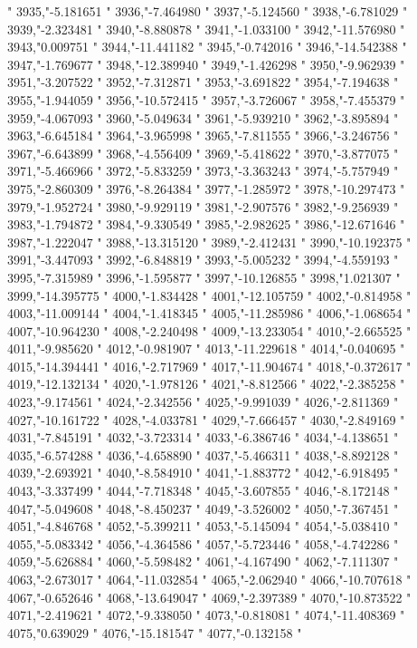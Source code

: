 "
3935,"-5.181651
"
3936,"-7.464980
"
3937,"-5.124560
"
3938,"-6.781029
"
3939,"-2.323481
"
3940,"-8.880878
"
3941,"-1.033100
"
3942,"-11.576980
"
3943,"0.009751
"
3944,"-11.441182
"
3945,"-0.742016
"
3946,"-14.542388
"
3947,"-1.769677
"
3948,"-12.389940
"
3949,"-1.426298
"
3950,"-9.962939
"
3951,"-3.207522
"
3952,"-7.312871
"
3953,"-3.691822
"
3954,"-7.194638
"
3955,"-1.944059
"
3956,"-10.572415
"
3957,"-3.726067
"
3958,"-7.455379
"
3959,"-4.067093
"
3960,"-5.049634
"
3961,"-5.939210
"
3962,"-3.895894
"
3963,"-6.645184
"
3964,"-3.965998
"
3965,"-7.811555
"
3966,"-3.246756
"
3967,"-6.643899
"
3968,"-4.556409
"
3969,"-5.418622
"
3970,"-3.877075
"
3971,"-5.466966
"
3972,"-5.833259
"
3973,"-3.363243
"
3974,"-5.757949
"
3975,"-2.860309
"
3976,"-8.264384
"
3977,"-1.285972
"
3978,"-10.297473
"
3979,"-1.952724
"
3980,"-9.929119
"
3981,"-2.907576
"
3982,"-9.256939
"
3983,"-1.794872
"
3984,"-9.330549
"
3985,"-2.982625
"
3986,"-12.671646
"
3987,"-1.222047
"
3988,"-13.315120
"
3989,"-2.412431
"
3990,"-10.192375
"
3991,"-3.447093
"
3992,"-6.848819
"
3993,"-5.005232
"
3994,"-4.559193
"
3995,"-7.315989
"
3996,"-1.595877
"
3997,"-10.126855
"
3998,"1.021307
"
3999,"-14.395775
"
4000,"-1.834428
"
4001,"-12.105759
"
4002,"-0.814958
"
4003,"-11.009144
"
4004,"-1.418345
"
4005,"-11.285986
"
4006,"-1.068654
"
4007,"-10.964230
"
4008,"-2.240498
"
4009,"-13.233054
"
4010,"-2.665525
"
4011,"-9.985620
"
4012,"-0.981907
"
4013,"-11.229618
"
4014,"-0.040695
"
4015,"-14.394441
"
4016,"-2.717969
"
4017,"-11.904674
"
4018,"-0.372617
"
4019,"-12.132134
"
4020,"-1.978126
"
4021,"-8.812566
"
4022,"-2.385258
"
4023,"-9.174561
"
4024,"-2.342556
"
4025,"-9.991039
"
4026,"-2.811369
"
4027,"-10.161722
"
4028,"-4.033781
"
4029,"-7.666457
"
4030,"-2.849169
"
4031,"-7.845191
"
4032,"-3.723314
"
4033,"-6.386746
"
4034,"-4.138651
"
4035,"-6.574288
"
4036,"-4.658890
"
4037,"-5.466311
"
4038,"-8.892128
"
4039,"-2.693921
"
4040,"-8.584910
"
4041,"-1.883772
"
4042,"-6.918495
"
4043,"-3.337499
"
4044,"-7.718348
"
4045,"-3.607855
"
4046,"-8.172148
"
4047,"-5.049608
"
4048,"-8.450237
"
4049,"-3.526002
"
4050,"-7.367451
"
4051,"-4.846768
"
4052,"-5.399211
"
4053,"-5.145094
"
4054,"-5.038410
"
4055,"-5.083342
"
4056,"-4.364586
"
4057,"-5.723446
"
4058,"-4.742286
"
4059,"-5.626884
"
4060,"-5.598482
"
4061,"-4.167490
"
4062,"-7.111307
"
4063,"-2.673017
"
4064,"-11.032854
"
4065,"-2.062940
"
4066,"-10.707618
"
4067,"-0.652646
"
4068,"-13.649047
"
4069,"-2.397389
"
4070,"-10.873522
"
4071,"-2.419621
"
4072,"-9.338050
"
4073,"-0.818081
"
4074,"-11.408369
"
4075,"0.639029
"
4076,"-15.181547
"
4077,"-0.132158
"
